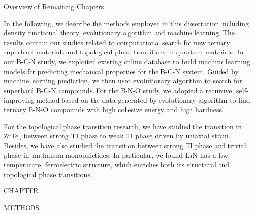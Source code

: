 	
	{\centering
		\vspace{12pt} Overview of Remaining Chapters
	    \par
	}
    In the following, we describe the methods employed in this dissertation including density functional theory, evolutionary algorithm and machine learning. The results contain our studies related to computational search for new ternary superhard materials and topological phase transitions in quantum materials. In our B-C-N study, we exploited existing online database to build machine learning models for predicting mechanical properties for the B-C-N system. Guided by machine learning prediction, we then used evolutionary algorithm to search for superhard B-C-N compounds. For the B-N-O study, we adopted a recursive, self-improving method based on the data generated by evolutionary algorithm to find ternary B-N-O compounds with high cohesive energy and high hardness.
    
    For the topological phase transition research, we have studied the transition in ZrTe$_5$ between strong TI phase to weak TI phase driven by uniaxial strain. Besides, we have also studied the transition between strong TI phase and trivial phase in lanthanum monopnictides. In particular, we found LaN has a low-temperature, ferroelectric structure, which enriches both its structural and topological phase transitions. 
    


    \clearpage

    \addtocounter{numch}{1}
	{\centering
		\vspace{0pt} \hspace{0pt} \par
	}
	{\centering
		\vspace{56pt} CHAPTER  \the\value{numch}
	}
	{\centering\singlespacing
		METHODS
	    \par
	}
	{\centering
		\vspace{0pt} \hspace{0pt} \par
	}

